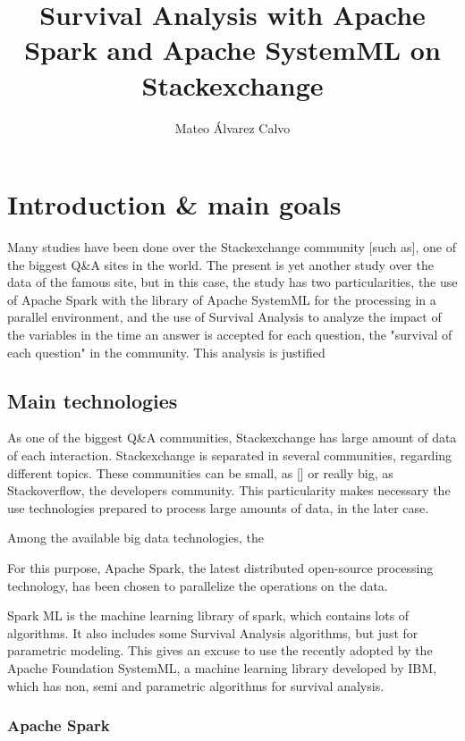\documentclass[11pt]{article} %
\title{Survival Analysis with Apache Spark and Apache SystemML on Stackexchange}
\author{Mateo Álvarez Calvo}
\begin{document}
\maketitle

\newpage
\tableofcontents
\newpage

\section{Introduction \& main goals}

Many studies have been done over the Stackexchange community [such as], one of the biggest Q\&A sites in the world. The present is yet another study over the data of the famous site, but in this case, the study has two particularities, the use of Apache Spark with the library of Apache SystemML for the processing in a parallel environment, and the use of Survival Analysis to analyze the impact of the variables in the time an answer is accepted for each question, the "survival of each question" in the community. This analysis is justified


\subsection{Main technologies}

As one of the biggest Q\&A communities, Stackexchange has large amount of data of each interaction.
Stackexchange is separated in several communities, regarding different topics. These communities can be small, as [] or really big, as Stackoverflow, the developers community. This particularity makes necessary the use technologies prepared to process large amounts of data, in the later case.

Among the available big data technologies, the

For this purpose, Apache Spark, the latest distributed open-source processing technology, has been chosen to parallelize the operations on the data.

Spark ML is the machine learning library of spark, which contains lots of algorithms. It also includes some Survival Analysis algorithms, but just for parametric modeling. This gives an excuse to use the recently adopted by the Apache Foundation SystemML, a machine learning library developed by IBM, which has non, semi and parametric algorithms for survival analysis.


\subsubsection{Apache Spark}
\end{document}
